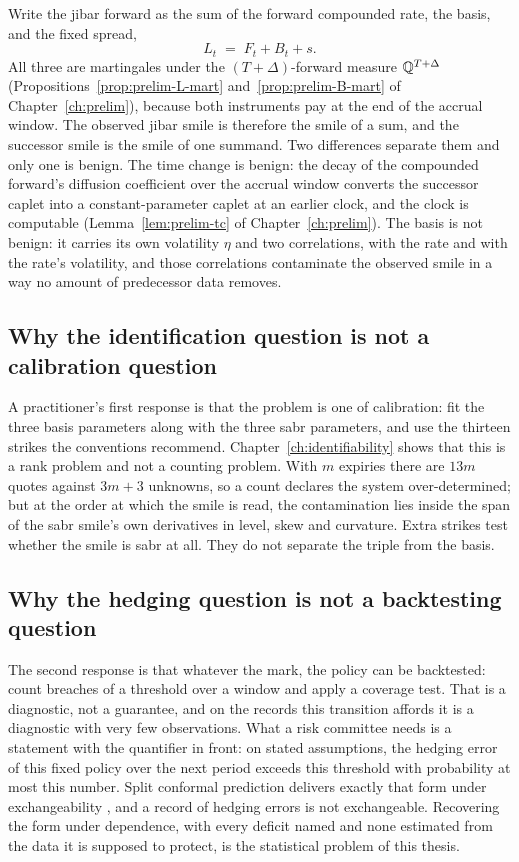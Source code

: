 \documentclass[../../../main.tex]{subfiles}
\begin{document}
Write the \gls{jibar} forward as the sum of the forward compounded rate, the basis, and the fixed spread,
\[
L_t \;=\; F_t + B_t + s .
\]
All three are martingales under the $(T+\Delta)$-forward measure $\mathbb{Q}^{T+\Delta}$ (Propositions~\ref{prop:prelim-L-mart} and~\ref{prop:prelim-B-mart} of Chapter~\ref{ch:prelim}), because both instruments pay at the end of the accrual window. The observed \gls{jibar} smile is therefore the smile of a sum, and the successor smile is the smile of one summand. Two differences separate them and only one is benign. The time change is benign: the decay of the compounded forward's diffusion coefficient over the accrual window converts the successor caplet into a constant-parameter caplet at an earlier clock, and the clock is computable (Lemma~\ref{lem:prelim-tc} of Chapter~\ref{ch:prelim}). The basis is not benign: it carries its own volatility $\eta$ and two correlations, with the rate and with the rate's volatility, and those correlations contaminate the observed smile in a way no amount of predecessor data removes.

\subsection{Why the identification question is not a calibration question}

A practitioner's first response is that the problem is one of calibration: fit the three basis parameters along with the three \gls{sabr} parameters, and use the thirteen strikes the conventions recommend. Chapter~\ref{ch:identifiability} shows that this is a rank problem and not a counting problem. With $m$ expiries there are $13m$ quotes against $3m+3$ unknowns, so a count declares the system over-determined; but at the order at which the smile is read, the contamination lies inside the span of the \gls{sabr} smile's own derivatives in level, skew and curvature. Extra strikes test whether the smile is \gls{sabr} at all. They do not separate the triple from the basis.

\subsection{Why the hedging question is not a backtesting question}

The second response is that whatever the mark, the policy can be backtested: count breaches of a threshold over a window and apply a coverage test. That is a diagnostic, not a guarantee, and on the records this transition affords it is a diagnostic with very few observations. What a risk committee needs is a statement with the quantifier in front: on stated assumptions, the hedging error of this fixed policy over the next period exceeds this threshold with probability at most this number. Split conformal prediction delivers exactly that form under exchangeability \citep{vovk2005}, and a record of hedging errors is not exchangeable. Recovering the form under dependence, with every deficit named and none estimated from the data it is supposed to protect, is the statistical problem of this thesis.
\end{document}
